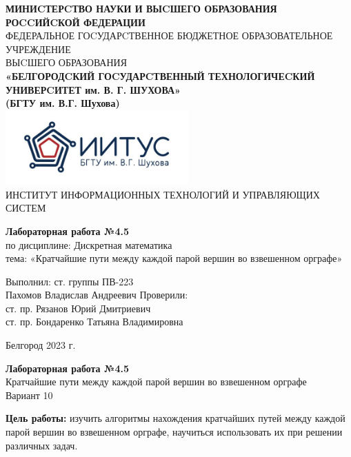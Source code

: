 \documentclass[a4paper,14pt]{extarticle}
\newcommand\textbox[1]{
	\parbox{.45\textwidth}{#1}
}
\begin{document}
\begin{center}
    \small{
        \textbf{МИНИCТЕРCТВО НАУКИ И ВЫCШЕГО ОБРАЗОВАНИЯ РОCCИЙCКОЙ ФЕДЕРАЦИИ}\\
        ФЕДЕРАЛЬНОЕ ГОCУДАРCТВЕННОЕ БЮДЖЕТНОЕ ОБРАЗОВАТЕЛЬНОЕ УЧРЕЖДЕНИЕ\\ВЫCШЕГО ОБРАЗОВАНИЯ \\
        \textbf{«БЕЛГОРОДCКИЙ ГОCУДАРCТВЕННЫЙ ТЕХНОЛОГИЧЕCКИЙ\\УНИВЕРCИТЕТ им. В. Г. ШУХОВА»\\ (БГТУ им. В.Г. Шухова)} \\
        \bigbreak
        \includegraphics[width=70mm]{log}\\
        ИНСТИТУТ ИНФОРМАЦИОННЫХ ТЕХНОЛОГИЙ И УПРАВЛЯЮЩИХ СИСТЕМ\\}
\end{center}

\vfill
\begin{center}
    \large{
        \textbf{
            Лабораторная работа №4.5}}\\
    \normalsize{
        по дисциплине: Дискретная математика \\
        тема: «Кратчайшие пути между каждой парой вершин
        во взвешенном орграфе»}
\end{center}
\vfill
\hfill\textbox{
    Выполнил: ст. группы ПВ-223\\Пахомов Владислав Андреевич
    \bigbreak
    Проверили: \\ст. пр. Рязанов Юрий Дмитриевич\\
    ст. пр. Бондаренко Татьяна Владимировна
}
\vfill\begin{center}
    Белгород 2023 г.
\end{center}
\newpage
\begin{center}
    \textbf{Лабораторная работа №4.5}\\
    Кратчайшие пути между каждой парой вершин во взвешенном орграфе\\
    Вариант 10
\end{center}
\textbf{Цель работы: }изучить алгоритмы нахождения кратчайших путей
между каждой парой вершин во взвешенном орграфе,
научиться использовать их при решении различных
задач.
\end{document}
